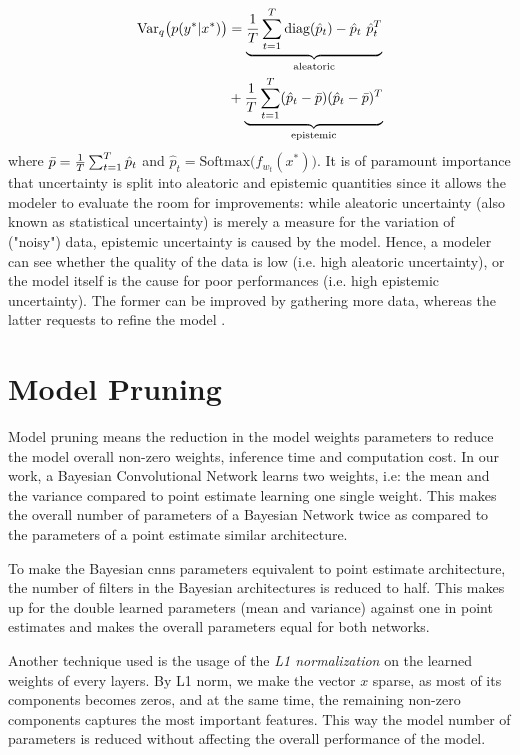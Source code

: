 \begin{equation}
    \begin{aligned}
    \text{Var}_q\big( p(y^*|x^*) \big) &= \underbrace{\frac{1}{T} \sum_{t=1}^T \text{diag}(\hat{p}_t)-\hat{p}_t \ \hat{p}_t^T}_\text{aleatoric} \\ &+ \underbrace{\frac{1}{T}\sum_{t=1}^T (\hat{p}_t - \Bar{p}) (\hat{p}_t - \Bar{p})^T}_\text{epistemic}
    \end{aligned}
\end{equation}
where $\Bar{p} = \frac{1}{T}\sum_{t=1}^T \hat{p}_t$ and $\hat{p}_t = \text{Softmax}\big ( f_{w_{t}}(x^*) \big )$.
\newline It is of paramount importance that uncertainty is split into aleatoric and epistemic quantities since it allows the modeler to evaluate the room for improvements: while aleatoric uncertainty (also known as statistical uncertainty) is merely a measure for the variation of ("noisy") data, epistemic uncertainty is caused by the model. Hence, a modeler can see whether the quality of the data is low (i.e. high aleatoric uncertainty), or the model itself is the cause for poor performances (i.e. high epistemic uncertainty). The former can be improved by gathering more data, whereas the latter requests to refine the model \cite{der2009aleatory}.

\section{Model Pruning}

Model pruning means the reduction in the model weights parameters to reduce the model overall non-zero weights, inference time and computation cost. In our work, a Bayesian Convolutional Network learns two weights, i.e: the mean and the variance compared to point estimate learning one single weight. This makes the overall number of parameters of a Bayesian Network twice as compared to the parameters of a point estimate similar architecture.

To make the Bayesian \acp{cnn} parameters equivalent to point estimate architecture, the number of filters in the Bayesian architectures is reduced to half. This makes up for the double learned parameters (mean and variance) against one in point estimates and makes the overall parameters equal for both networks. 

Another technique used is the usage of the \textit{L1 normalization} on the learned weights of every layers.  By L1 norm, we make the vector $x$ sparse, as most of its components becomes zeros, and at the same time, the remaining non-zero components captures the most important features. This way the model number of parameters is reduced without affecting the overall performance of the model. 
